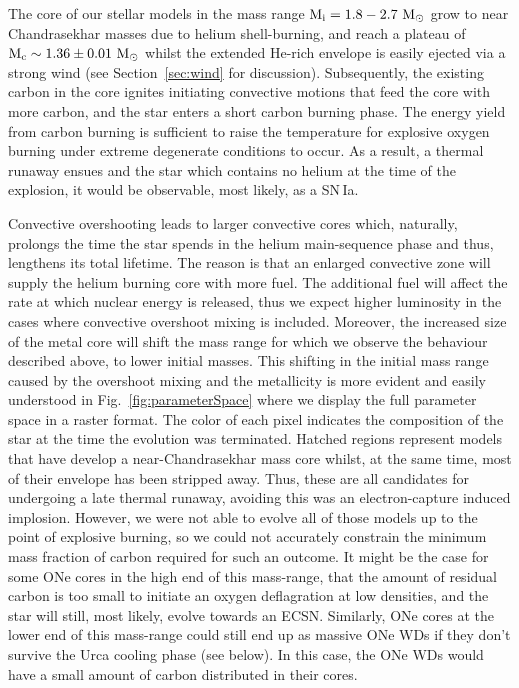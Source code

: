 \documentclass[../../main/thesis_msc.tex]{subfiles}
\begin{document}
    
    The core of our stellar models in the mass range $\rm M_i = 1.8 - 2.7 \ M_{\odot}$ grow to near Chandrasekhar masses due to helium shell-burning, and reach a plateau of $\rm M_c \sim 1.36 \pm 0.01 \ M_{\odot}$ whilst the extended He-rich envelope is easily ejected via a strong wind (see Section\, \ref{sec:wind} for discussion).
    Subsequently, the existing carbon in the core ignites initiating convective motions that feed the core with more carbon, and the star enters a short carbon burning phase. The energy yield from carbon burning is sufficient to raise the temperature for explosive oxygen burning under extreme degenerate conditions to occur. As a result, a thermal runaway ensues and the star which contains no helium at the time of the explosion, it would be observable, most likely, as a SN\,Ia.
    
    Convective overshooting leads to larger convective cores which, naturally, prolongs the time the star spends in the helium main-sequence phase and thus, lengthens its total lifetime. The reason is that an enlarged convective zone will supply the helium burning core with more fuel. The additional fuel will affect the rate at which nuclear energy is released, thus we expect higher luminosity in the cases where convective overshoot mixing is included. Moreover, the increased size of the metal core will shift the mass range for which we observe the behaviour described above, to lower initial masses. This shifting in the initial mass range caused by the overshoot mixing and the metallicity is more evident and easily understood in Fig.\, \ref{fig:parameterSpace} where we display the full parameter space in a raster format. The color of each pixel indicates the composition of the star at the time the evolution was terminated. Hatched regions represent models that have develop a near-Chandrasekhar mass core whilst, at the same time, most of their envelope has been stripped away. Thus, these are all candidates for undergoing a late thermal runaway, avoiding this was an electron-capture induced implosion. However, we were not able to evolve all of those models up to the point of explosive burning, so we could not accurately constrain the minimum mass fraction of carbon required for such an outcome. It might be the case for some ONe cores in the high end of this mass-range, that the amount of residual carbon is too small to initiate an oxygen deflagration at low densities, and the star will still, most likely, evolve towards an ECSN. Similarly, ONe cores at the lower end of this mass-range could still end up as massive ONe WDs if they don't survive the Urca cooling phase (see below). In this case, the ONe WDs would have a small amount of carbon distributed in their cores.
    
\end{document}
